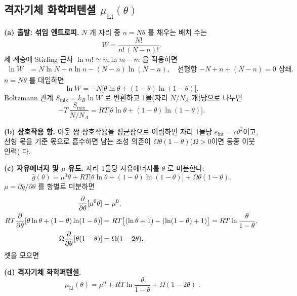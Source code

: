 \documentclass[11pt,a4paper]{article}
\begin{document}
\subsection{격자기체 화학퍼텐셜 $\mu_\mathrm{Li}(\theta)$}

\textbf{(a) 출발: 섞임 엔트로피.} $N$ 개 자리 중 $n=N\theta$ 를 채우는 배치 수는
\begin{equation}
W = \frac{N!}{n!\,(N-n)!}.
\label{eq:W}
\end{equation}
세 계승에 Stirling 근사 $\ln m! \simeq m\ln m - m$ 을 적용하면
\begin{align}
\ln W &= N\ln N - n\ln n - (N-n)\ln(N-n),\quad \text{선형항 } {-N+n+(N-n)=0} \text{ 상쇄}.
\label{eq:stirling}
\end{align}
$n=N\theta$ 를 대입하면
\begin{equation}
\ln W = -N\bigl[\theta\ln\theta + (1-\theta)\ln(1-\theta)\bigr].
\label{eq:lnW}
\end{equation}
Boltzmann 관계 $S_\mathrm{mix}=k_B\ln W$ 로 변환하고 1몰(자리 $N/N_A$ 개)당으로 나누면
\begin{equation}
-T\,\frac{S_\mathrm{mix}}{N/N_A}
= RT\bigl[\theta\ln\theta+(1-\theta)\ln(1-\theta)\bigr].
\label{eq:smixmol}
\end{equation}

\textbf{(b) 상호작용 항.} 이웃 쌍 상호작용을 평균장으로 어림하면 자리 1몰당
$e_\mathrm{int}=c\theta^2$이고, 선형 몫을 기준 몫으로 흡수하면 남는 조성 의존이
$\Omega\theta(1-\theta)$($\Omega>0$이면 동종 이웃 인력) 다.

\textbf{(c) 자유에너지 및 $\mu$ 유도.} 자리 1몰당 자유에너지를 $\theta$ 로 미분한다:
\begin{equation}
\bar g(\theta) = \mu^0\theta + RT\bigl[\theta\ln\theta+(1-\theta)\ln(1-\theta)\bigr] + \Omega\theta(1-\theta).
\label{eq:gbar}
\end{equation}
$\mu = \partial\bar g/\partial\theta$ 를 항별로 미분하면
\begin{align}
\frac{\partial}{\partial\theta}[\mu^0\theta] &= \mu^0, \notag\\
RT\frac{\partial}{\partial\theta}[\theta\ln\theta+(1-\theta)\ln(1-\theta)]
&= RT\bigl[(\ln\theta+1)-(\ln(1-\theta)+1)\bigr] = RT\ln\frac{\theta}{1-\theta},
\label{eq:mixderiv}\\
\Omega\frac{\partial}{\partial\theta}[\theta(1-\theta)] &= \Omega(1-2\theta). \notag
\end{align}
셋을 모으면

\textbf{(d) 격자기체 화학퍼텐셜.}
\begin{equation}
\boxed{\;\mu_\mathrm{Li}(\theta) = \mu^0 + RT\ln\frac{\theta}{1-\theta} + \Omega(1-2\theta)\;.}
\label{eq:mu}
\end{equation}
\end{document}
